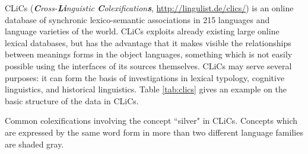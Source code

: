 

CLiCs (\emph{\textbf{C}ross-\textbf{Li}nguistic \textbf{C}olexification\textbf{s}},
\url{http://lingulist.de/clics/}) is an online database of synchronic lexico-semantic associations
in 215 languages and language varieties of the world. CLiCs exploits already existing large online
lexical databases, but has the advantage that it makes visible the relationships between meanings
forms in the object languages, something which is not easily possible using the interfaces of its
sources themselves. CLiCs may serve several purposes: it can form the basis of investigations in
lexical typology, cognitive linguistics, and historical linguistics. Table \ref{tab:clics} gives an example on the basic structure of the data in CLiCs.
 
\begin{table}[b]
    \centering
{}
\caption{Common colexifications involving the concept ``silver" in CLiCs. Concepts which are
expressed by the same word form in more than two different language families are shaded gray.}
\label{tab:clics}
\end{table}

